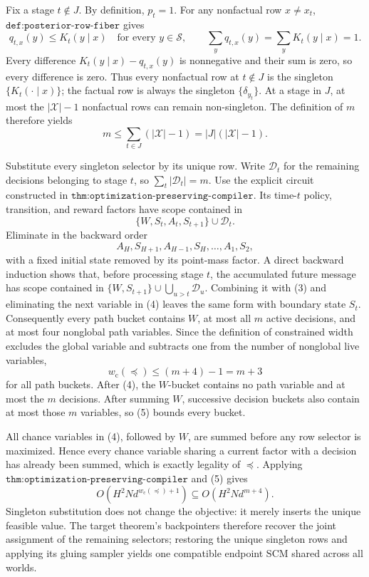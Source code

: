 Fix a stage \(t\notin J\).  By definition, \(p_t=1\).  For any nonfactual row \(x\ne x_t\), \(\texttt{def:posterior-row-fiber}\) gives
\[
 q_{t,x}(y)\le K_t(y\mid x)\quad\text{for every }y\in\mathcal S,
 \qquad
 \sum_yq_{t,x}(y)=\sum_yK_t(y\mid x)=1.
 \tag{1}
\]
Every difference \(K_t(y\mid x)-q_{t,x}(y)\) is nonnegative and their sum is zero, so every difference is zero.  Thus every nonfactual row at \(t\notin J\) is the singleton \(\{K_t(\cdot\mid x)\}\); the factual row is always the singleton \(\{\delta_{y_t}\}\).  At a stage in \(J\), at most the \(|\mathcal X|-1\) nonfactual rows can remain non-singleton.  The definition of \(m\) therefore yields
\[
 m\le\sum_{t\in J}(|\mathcal X|-1)=|J|(|\mathcal X|-1).
 \tag{2}
\]

Substitute every singleton selector by its unique row.  Write \(\mathcal D_t\) for the remaining decisions belonging to stage \(t\), so \(\sum_t|\mathcal D_t|=m\).  Use the explicit circuit constructed in \(\texttt{thm:optimization-preserving-compiler}\).  Its time-\(t\) policy, transition, and reward factors have scope contained in
\[
 \{W,S_t,A_t,S_{t+1}\}\cup\mathcal D_t.
 \tag{3}
\]
Eliminate in the backward order
\[
 A_H,S_{H+1},A_{H-1},S_H,\ldots,A_1,S_2,
 \tag{4}
\]
with a fixed initial state removed by its point-mass factor.  A direct backward induction shows that, before processing stage \(t\), the accumulated future message has scope contained in \(\{W,S_{t+1}\}\cup\bigcup_{u>t}\mathcal D_u\).  Combining it with (3) and eliminating the next variable in (4) leaves the same form with boundary state \(S_t\).  Consequently every path bucket contains \(W\), at most all \(m\) active decisions, and at most four nonglobal path variables.  Since the definition of constrained width excludes the global variable and subtracts one from the number of nonglobal live variables,
\[
 w_{\mathrm c}(\preceq)\le (m+4)-1=m+3
 \tag{5}
\]
for all path buckets.  After (4), the \(W\)-bucket contains no path variable and at most the \(m\) decisions.  After summing \(W\), successive decision buckets also contain at most those \(m\) variables, so (5) bounds every bucket.

All chance variables in (4), followed by \(W\), are summed before any row selector is maximized.  Hence every chance variable sharing a current factor with a decision has already been summed, which is exactly legality of \(\preceq\).  Applying \(\texttt{thm:optimization-preserving-compiler}\) and (5) gives
\[
 O\!\left(H^2N d^{w_{\mathrm c}(\preceq)+1}\right)
 \subseteq O\!\left(H^2N d^{m+4}\right).
 \tag{6}
\]
Singleton substitution does not change the objective: it merely inserts the unique feasible value.  The target theorem's backpointers therefore recover the joint assignment of the remaining selectors; restoring the unique singleton rows and applying its gluing sampler yields one compatible endpoint SCM shared across all worlds.

